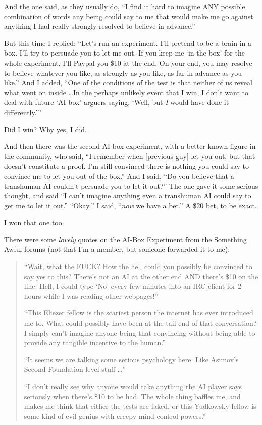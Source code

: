 {
 And the one said, as they usually do, ``I find it
hard to imagine ANY possible combination of words any being could say
to me that would make me go against anything I had really strongly
resolved to believe in advance.''}

{
 But this time I replied: ``Let's
run an experiment. I'll pretend to be a brain in a box.
I'll try to persuade you to let me out. If you keep me
`in the box' for the whole experiment,
I'll Paypal you \$10 at the end. On your end, you may
resolve to believe whatever you like, as strongly as you like, as far
in advance as you like.'' And I added,
``One of the conditions of the test is that neither of
us reveal what went on inside \ldots In the perhaps unlikely event that
I win, I don't want to deal with future
`AI box' arguers saying,
`Well, but \textit{I} would have done it
differently.'''}

{
 Did I win? Why yes, I did.}

{
 And then there was the second AI-box experiment, with a
better-known figure in the community, who said, ``I
remember when [previous guy] let you out, but that
doesn't constitute a proof. I'm still
convinced there is nothing you could say to convince me to let you out
of the box.'' And I said, ``Do you
believe that a transhuman AI couldn't persuade you to
let it out?'' The one gave it some serious thought,
and said ``I can't imagine anything
even a transhuman AI could say to get me to let it
out.'' ``Okay,'' I
said, ``\textit{now} we have a
bet.'' A \$20 bet, to be exact.}

{
 I won that one too.}

{
 There were some \textit{lovely} quotes on the AI-Box Experiment
from the Something Awful forums (not that I'm a member,
but someone forwarded it to me):}

\begin{quotation}
{
 ``Wait, what the FUCK? How the hell could you
possibly be convinced to say yes to this? There's not
an AI at the other end AND there's \$10 on the line.
Hell, I could type `No' every few
minutes into an IRC client for 2 hours while I was reading other
webpages!''}

{
 ``This Eliezer fellow is the scariest person the
internet has ever introduced me to. What could possibly have been at
the tail end of that conversation? I simply can't
imagine anyone being that convincing without being able to provide any
tangible incentive to the human.''}

{
 ``It seems we are talking some serious psychology
here. Like Asimov's Second Foundation level stuff
\ldots''}

{
 ``I don't really see why anyone
would take anything the AI player says seriously when
there's \$10 to be had. The whole thing baffles me, and
makes me think that either the tests are faked, or this Yudkowsky
fellow is some kind of evil genius with creepy mind-control
powers.''}
\end{quotation}

